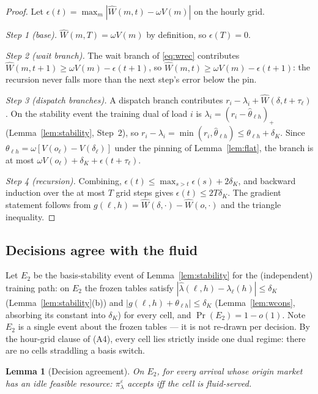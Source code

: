 \documentclass[11pt]{article}
\newtheorem{lemma}{Lemma}
\newcommand{\pol}{\pi_{\lambda}}
\begin{document}
\begin{proof}
Let $\epsilon(t) = \max_m |\widehat{W}(m, t) - \omega V(m)|$ on the
hourly grid.

\emph{Step 1 (base).} $\widehat{W}(m, T) = \omega V(m)$ by definition,
so $\epsilon(T) = 0$.

\emph{Step 2 (wait branch).} The wait branch of \eqref{eq:wrec}
contributes $\widehat{W}(m, t{+}1) \geq \omega V(m) - \epsilon(t{+}1)$,
so $\widehat{W}(m, t) \geq \omega V(m) - \epsilon(t{+}1)$: the
recursion never falls more than the next step's error below the pin.

\emph{Step 3 (dispatch branches).} A dispatch branch contributes
$r_i - \lambda_i + \widehat{W}(\delta, t + \tau_{\ell})$. On the
stability event the training dual of load $i$ is
$\lambda_i = (r_i - \hat{\theta}_{\ell h})_+$
(Lemma~\ref{lem:stability}, Step~2), so
$r_i - \lambda_i = \min(r_i, \hat{\theta}_{\ell h}) \leq
\theta_{\ell h} + \delta_K$. Since
$\theta_{\ell h} = \omega [V(o_{\ell}) - V(\delta_{\ell})]$ under the
pinning of Lemma~\ref{lem:flat}, the branch is at most
$\omega V(o_{\ell}) + \delta_K + \epsilon(t + \tau_{\ell})$.

\emph{Step 4 (recursion).} Combining,
$\epsilon(t) \leq \max_{s > t} \epsilon(s) + 2 \delta_K$, and backward
induction over the at most $T$ grid steps gives
$\epsilon(t) \leq 2 T \delta_K$. The gradient statement follows from
$g(\ell, h) = \widehat{W}(\delta, \cdot) - \widehat{W}(o, \cdot)$ and
the triangle inequality.
\end{proof}

\subsection{Decisions agree with the fluid}

Let $E_2$ be the basis-stability event of
Lemma~\ref{lem:stability} for the (independent) training path: on
$E_2$ the frozen tables satisfy
$|\hat{\lambda}(\ell, h) - \lambda_{\ell}(h)| \leq \delta_K$
(Lemma~\ref{lem:stability}(b)) and
$|g(\ell, h) + \theta_{\ell h}| \leq \delta_K$
(Lemma~\ref{lem:wcons}, absorbing its constant into $\delta_K$) for
every cell, and $\Pr(E_2) = 1 - o(1)$. Note $E_2$ is a single event
about the frozen tables --- it is not re-drawn per decision. By the
hour-grid clause of (A4), every cell lies strictly inside one dual
regime: there are no cells straddling a basis switch.

\begin{lemma}[Decision agreement]
\label{lem:agree}
On $E_2$, for every arrival whose origin market has
an idle feasible resource: $\pol^{\varepsilon}$ accepts iff the cell is
fluid-served.
\end{lemma}
\end{document}
